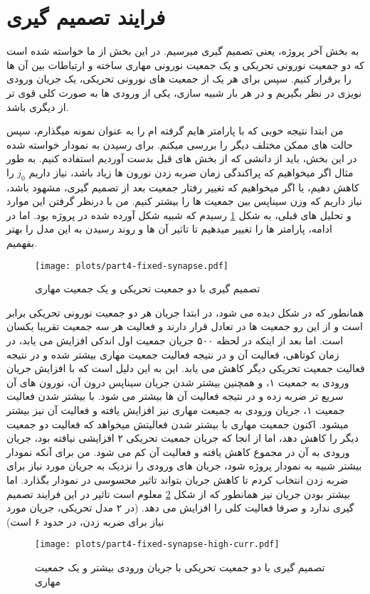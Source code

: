 
\section{فرایند تصمیم گیری}
    به بخش آخر پروژه، یعنی تصمیم گیری میرسیم. در این بخش از ما خواسته شده است که دو جمعیت نورونی تحریکی و یک جمعیت نورونی مهاری ساخته و ارتباطات بین آن ها را برقرار کنیم. سپس برای هر یک از جمعیت های نورونی تحریکی، یک جریان ورودی نویزی در نظر بگیریم و در هر بار شبیه سازی، یکی از ورودی ها به صورت کلی قوی تر از دیگری باشد.

    من ابتدا نتیجه خوبی که با پارامتر هایم گرفته ام را به عنوان نمونه میگذارم، سپس حالت های ممکن مختلف دیگر را بررسی میکنم.
    برای رسیدن به نمودار خواسته شده در این بخش، باید از دانشی که از بخش های قبل بدست آوردیم استفاده کنیم. به طور مثال اگر میخواهیم که پراکندگی زمان ضربه زدن نورون ها زیاد باشد، نیاز داریم 
    $j_0$ 
    را کاهش دهیم، یا اگر میخواهیم که تغییر رفتار جمعیت بعد از تصمیم گیری، مشهود باشد، نیاز داریم که وزن سیناپس بین جمعیت ها را بیشتر کنیم. من با درنظر گرفتن این موارد و تحلیل های قبلی، به شکل
    \ref{fig:part4-fixed-synapse}
    رسیدم که شبیه شکل آورده شده در پروژه بود. اما در ادامه، پارامتر ها را تغییر میدهیم تا تاثیر آن ها و روند رسیدن به این مدل را بهتر بفهمیم.
    \begin{figure}[!ht]
        \centering
        \texttt{[image: plots/part4-fixed-synapse.pdf]} 
        \caption{تصمیم گیری با دو جمعیت تحریکی و یک جمعیت مهاری}
        \label{fig:part4-fixed-synapse}
    \end{figure}
    همانطور که در شکل دیده می شود، در ابتدا جریان هر دو جمعیت نورونی تحریکی برابر است و از این رو جمعیت ها در تعادل قرار دارند و فعالیت هر سه جمعیت تقریبا یکسان است. اما بعد از اینکه در لحظه ۵۰۰ جریان جمعیت اول اندکی افزایش می یابد، در زمان کوتاهی، فعالیت آن و در نتیجه فعالیت جمعیت مهاری بیشتر شده و در نتیجه فعالیت جمعیت تحریکی دیگر کاهش می یابد. این به این دلیل است که با افزایش جریان ورودی به جمعیت ۱، و همچنین بیشتر شدن جریان سیناپس درون آن، نورون های آن سریع تر ضربه زده و در نتیجه فعالیت آن ها بیشتر می شود. با بیشتر شدن فعالیت جمعیت ۱، جریان ورودی به جمیعت مهاری نیز افزایش یافته و فعالیت آن نیز بیشتر میشود. اکنون جمعیت مهاری با بیشتر شدن فعالیتش میخواهد که فعالیت دو جمعیت دیگر را کاهش دهد، اما از انجا که جریان جمعیت تحریکی ۲ افزایشی نیافته بود، جریان ورودی به آن در مجموع کاهش یافته و فعالیت آن کم می شود.
    من برای آنکه نمودار بیشتر شبیه به نمودار پروژه شود، جریان های ورودی را نزدیک به جریان مورد نیاز برای ضربه زدن انتخاب کردم تا کاهش جریان بتواند تاثیر محسوسی در نمودار بگذارد. اما بیشتر بودن جریان نیز همانطور که از شکل
    \ref{fig:part4-fixed-synapse-high-curr}
    معلوم است تاثیر در این فرایند تصمیم گیری ندارد و صرفا فعالیت کلی را افزایش می دهد.
    (در ۲ مدل تحریکی، جریان مورد نیاز برای ضربه زدن، در حدود ۶ است)
    \begin{figure}[!ht]
        \centering
        \texttt{[image: plots/part4-fixed-synapse-high-curr.pdf]} 
        \caption{تصمیم گیری با دو جمعیت تحریکی با جریان ورودی بیشتر و یک جمعیت مهاری}
        \label{fig:part4-fixed-synapse-high-curr}
    \end{figure}

